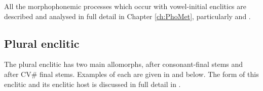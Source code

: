 \begin{exe}
	\label{ex:VaCVbr+=V->VaVaCb=V -2}
\end{exe}

All the morphophonemic processes which occur with vowel-initial
enclitics are described and analysed
in full detail in Chapter \ref{ch:PhoMet},
particularly  and .

\subsection{Plural enclitic}\label{sec:PluEnc2}
The plural enclitic has two main allomorphs,
 after consonant-final stems
and  after CV{\#} final stems.
Examples of each are given in 
and  below.
The form of this enclitic and its enclitic host
is discussed in full detail in .

